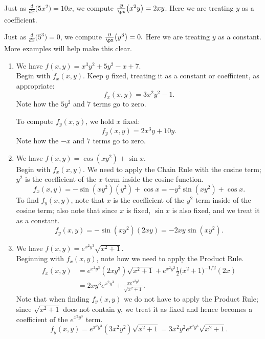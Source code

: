 Just as $\frac{d}{dx}\big(5x^2\big) = 10x$, we compute $\frac{\partial}{\px}\big(x^2y\big) = 2xy$. Here we are treating $y$ as a coefficient.

Just as $\frac{d}{dx}\big(5^3\big) = 0$, we compute $\frac{\partial}{\px}\big(y^3\big) = 0.$ Here we are treating $y$ as a constant. More examples will help make this clear.

{\begin{enumerate}
	\item We have $f(x,y) = x^3y^2+ 5y^2-x+7$.\\
	Begin with $f_x(x,y)$. Keep $y$ fixed, treating it as a constant or coefficient, as appropriate:
	$$f_x(x,y) = 3x^2y^2-1.$$ Note how the $5y^2$ and $7$ terms go to zero.
	
	To compute $f_y(x,y)$, we hold $x$ fixed:
	$$f_y(x,y) = 2x^3y+10y.$$ Note how the $-x$ and $7$ terms go to zero.
	
	\item We have $f(x,y) = \cos(xy^2)+\sin x$.\\
	Begin with $f_x(x,y)$. We need to apply the Chain Rule with the cosine term; $y^2$ is the coefficient of the $x$-term inside the cosine function.
	$$f_x(x,y) = -\sin(xy^2)(y^2)+\cos x = -y^2\sin(xy^2)+\cos x.$$
	To find $f_y(x,y)$, note that $x$ is the coefficient of the $y^2$ term inside of the cosine term; also note that since $x$ is fixed, $\sin x$ is also fixed, and we treat it as a constant.
	$$f_y(x,y) = -\sin(xy^2)(2xy) = -2xy\sin(xy^2).$$
	
	\item		We have $f(x,y) = e^{x^2y^3}\sqrt{x^2+1}$.\\
	Beginning with $f_x(x,y)$, note how we need to apply the Product Rule. 
	\begin{align*}
	f_x(x,y) &= e^{x^2y^3}(2xy^3)\sqrt{x^2+1} + e^{x^2y^3}\frac12\big(x^2+1\big)^{-1/2}(2x) \\
					&= 2xy^3e^{x^2y^3}+\frac{x e^{x^2y^3}}{\sqrt{x^2+1}}.
	\end{align*}
	Note that when finding $f_y(x,y)$ we do not have to apply the Product Rule; since $\sqrt{x^2+1}$ does not contain $y$, we treat it as fixed and hence becomes a coefficient of the $e^{x^2y^3}$ term.
	$$f_y(x,y) = e^{x^2y^3}(3x^2y^2)\sqrt{x^2+1} = 3x^2y^2e^{x^2y^3}\sqrt{x^2+1}.$$
\end{enumerate}}

